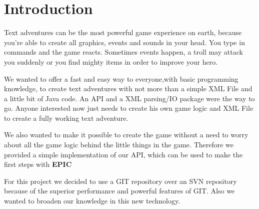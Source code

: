 \chapter{Introduction}

Text adventures can be the most powerful game experience on earth, because you're able to create all graphics, events and sounds in your head. You type in commands and the game reacts. Sometimes events happen, a troll may attack you suddenly or you find mighty items in order to improve your hero. 

We wanted to offer a fast and easy way to everyone,with basic programming knowledge, to create text adventures with not more than a simple XML File and a little bit of Java code.  An API and a XML parsing/IO package were the way to go.  Anyone interested now just needs to create his own game logic and XML File to create a fully working text adventure.

We also wanted to make it possible to create the game without a need to worry about all the game logic behind the little things in the game. Therefore we provided a simple implementation of our API, which can be used to make the first steps with \textbf{EPIC}

For this project we decided to use a GIT repository over an SVN repository because of the superior performance and powerful features of GIT. Also we wanted to broaden our knowledge in this new technology.
